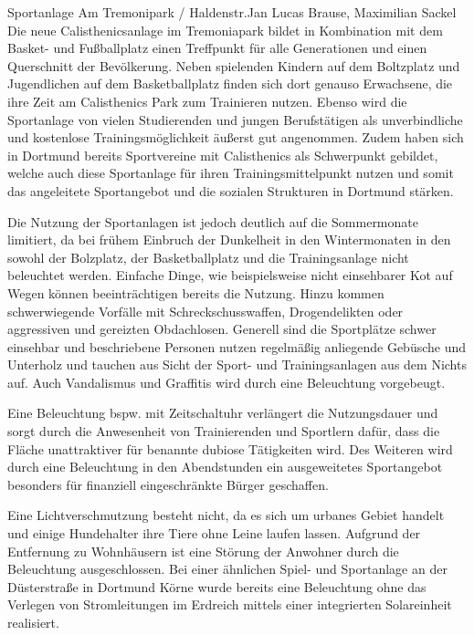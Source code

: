 \documentclass{../../templates/amendment}
\date{29. Dezember 2024}
\begin{document}
\begin{boxed}{Sportanlage Am Tremonipark / Haldenstr.}{Jan Lucas Brause, Maximilian Sackel}
    Die neue Calisthenicsanlage im Tremoniapark bildet in Kombination mit dem Basket- und Fußballplatz einen Treffpunkt für alle Generationen und einen Querschnitt der Bevölkerung.
    Neben spielenden Kindern auf dem Boltzplatz und Jugendlichen auf dem Basketballplatz finden sich dort genauso Erwachsene, die ihre Zeit am Calisthenics Park zum Trainieren nutzen.
    Ebenso wird die Sportanlage von vielen Studierenden und jungen Berufstätigen als unverbindliche und kostenlose Trainingsmöglichkeit äußerst gut angenommen.
    Zudem haben sich in Dortmund bereits Sportvereine mit Calisthenics als Schwerpunkt gebildet, welche auch diese Sportanlage für ihren Trainingsmittelpunkt nutzen und somit das angeleitete Sportangebot und die sozialen Strukturen in Dortmund stärken.

    Die Nutzung der Sportanlagen ist jedoch deutlich auf die Sommermonate limitiert, da bei frühem Einbruch der Dunkelheit in den Wintermonaten in den sowohl der Bolzplatz, der Basketballplatz und die Trainingsanlage nicht beleuchtet werden.
    Einfache Dinge, wie beispielsweise nicht einsehbarer Kot auf Wegen können beeinträchtigen bereits die Nutzung.
    Hinzu kommen schwerwiegende Vorfälle mit Schreckschusswaffen, Drogendelikten oder aggressiven und gereizten Obdachlosen.
    Generell sind die Sportplätze schwer einsehbar und beschriebene Personen nutzen regelmäßig anliegende Gebüsche und Unterholz und tauchen aus Sicht der Sport- und Trainingsanlagen aus dem Nichts auf.
    Auch Vandalismus und Graffitis wird durch eine Beleuchtung vorgebeugt.

    Eine Beleuchtung bspw. mit Zeitschaltuhr verlängert die Nutzungsdauer und sorgt durch die Anwesenheit von Trainierenden und Sportlern dafür, dass die Fläche unattraktiver für benannte dubiose Tätigkeiten wird.
    Des Weiteren wird durch eine Beleuchtung in den Abendstunden ein ausgeweitetes Sportangebot besonders für finanziell eingeschränkte Bürger geschaffen.

    Eine Lichtverschmutzung besteht nicht, da es sich um urbanes Gebiet handelt und einige Hundehalter ihre Tiere ohne Leine laufen lassen.
    Aufgrund der Entfernung zu Wohnhäusern ist eine Störung der Anwohner durch die Beleuchtung ausgeschlossen.
    Bei einer ähnlichen Spiel- und Sportanlage an der Düsterstraße in Dortmund Körne wurde bereits eine Beleuchtung ohne das Verlegen von Stromleitungen im Erdreich mittels einer integrierten Solareinheit realisiert.


\end{boxed}
\end{document}
